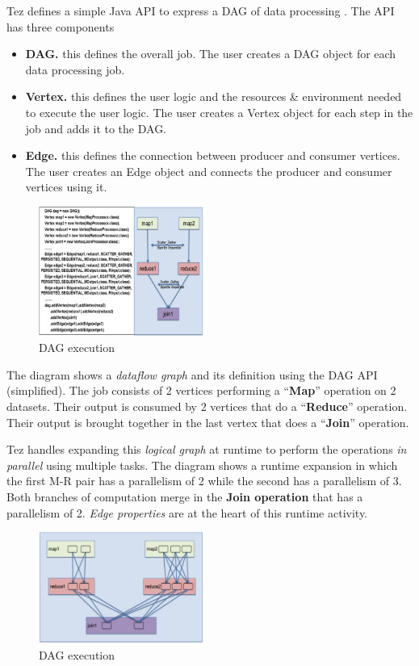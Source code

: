 \documentclass[twocolumn]{article}
\begin{document}
Tez defines a simple Java API to express a DAG of data processing \cite{Saha:2013-02}. 
The API has three components

\begin{itemize}
\item
  \textbf{DAG.} this defines the overall job. The user creates a DAG
  object for each data processing job.
\item
  \textbf{Vertex.} this defines the user logic and the resources \&
  environment needed to execute the user logic. The user creates a
  Vertex object for each step in the job and adds it to the DAG.
\item
  \textbf{Edge.} this defines the connection between producer and
  consumer vertices. The user creates an Edge object and connects the
  producer and consumer vertices using it.
\end{itemize}

\begin{figure}[htb]
        \centering
        \includegraphics[width=0.48\textwidth]{tez11}
        \caption{DAG execution}
        \label{fig07}
\end{figure}

The diagram shows a \emph{dataflow graph} and its definition using the
DAG API (simplified). The job consists of 2 vertices performing a
``\textbf{Map}'' operation on 2 datasets. Their output is consumed by 2
vertices that do a ``\textbf{Reduce}'' operation. Their output is
brought together in the last vertex that does a ``\textbf{Join}''
operation.

Tez handles expanding this \emph{logical graph} at runtime to perform
the operations \emph{in parallel} using multiple tasks. The diagram
shows a runtime expansion in which the first M-R pair has a parallelism
of 2 while the second has a parallelism of 3. Both branches of
computation merge in the \textbf{Join operation} that has a parallelism
of 2. \emph{Edge properties} are at the heart of this runtime activity.

\begin{figure}[htb]
        \centering
        \includegraphics[width=0.48\textwidth]{tez21}
        \caption{DAG execution}
        \label{fig08}
\end{figure}
\end{document}
